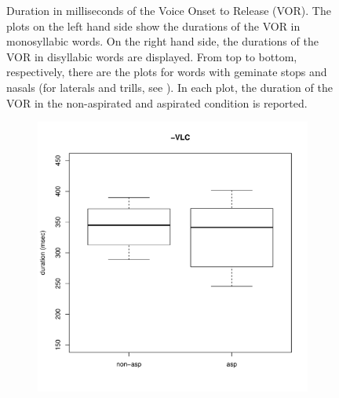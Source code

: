 \documentclass[11pt,a4paper,oneside,openany]{memoir}\usepackage[]{graphicx}\usepackage[]{color}
\newenvironment{knitrout}{}{} %
\begin{document}
\begin{figure}
\begin{subfigure}{.5\textwidth}
\begin{knitrout}
\end{knitrout}
\end{subfigure}
\caption[Duration in milliseconds of the Voice Onset to Release (VOR).]{Duration in milliseconds of the Voice Onset to Release (VOR).
The plots on the left hand side show the durations of the VOR in monosyllabic words.
On the right hand side, the durations of the VOR in disyllabic words are displayed.
From top to bottom, respectively, there are the plots for words with geminate stops and nasals (for laterals and trills, see ).
In each plot, the duration of the VOR in the non-aspirated and aspirated condition is reported.
}
\label{f:vor}
\end{figure}

\begin{figure}
\begin{subfigure}{.5\textwidth}
\centering
\begin{knitrout}
\color{fgcolor}
\includegraphics[width=\textwidth]{img/mono-lat-vor-1} 


\end{knitrout}
\end{subfigure}
\end{figure}
\end{document}
